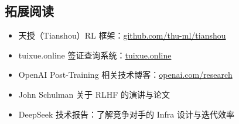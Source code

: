 \documentclass[a4paper]{article}
\begin{document}
\subsection{拓展阅读}

\begin{itemize}
\item 天授（Tianshou）RL 框架：\href{https://github.com/thu-ml/tianshou}{github.com/thu-ml/tianshou}
\item tuixue.online 签证查询系统：\href{https://tuixue.online}{tuixue.online}
\item OpenAI Post-Training 相关技术博客：\href{https://openai.com/research}{openai.com/research}
\item John Schulman 关于 RLHF 的演讲与论文
\item DeepSeek 技术报告：了解竞争对手的 Infra 设计与迭代效率
\end{itemize}
\end{document}
